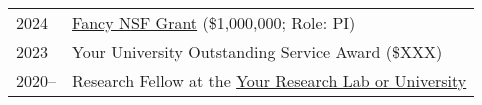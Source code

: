 
\begin{longtable}[l]{@{}p{} p{}}
    2024 & \href{https://www.nsf.gov/}{Fancy NSF Grant} (\$1,000,000; Role: PI) \\
   
    2023 & Your University Outstanding Service Award (\$XXX) \\
       
    2020-- & Research Fellow at the \href{https://example.com/}{Your Research Lab or University} \\

   
\end{longtable}
